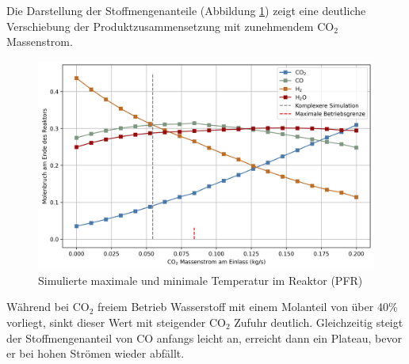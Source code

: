     Die Darstellung der Stoffmengenanteile (Abbildung \ref{fig:parameterstudie_molenbruch}) zeigt eine deutliche Verschiebung der Produktzusammensetzung mit zunehmendem CO$_2$ Massenstrom. 
    \begin{figure}[H]
        \centering
        \includegraphics[width=0.9\linewidth]{img/Parameterstudie_CO2/Parameterstudie_CO2_Molenbruch_Ende.png}
        \caption{Simulierte maximale und minimale Temperatur im Reaktor (PFR)}
        \label{fig:parameterstudie_molenbruch}
    \end{figure}
    Während bei CO$_2$ freiem Betrieb Wasserstoff mit einem Molanteil von über 40\% vorliegt, sinkt dieser Wert mit steigender CO$_2$ Zufuhr deutlich. Gleichzeitig steigt der Stoffmengenanteil von CO anfangs leicht an, erreicht dann ein Plateau, bevor er bei hohen Strömen wieder abfällt. 

